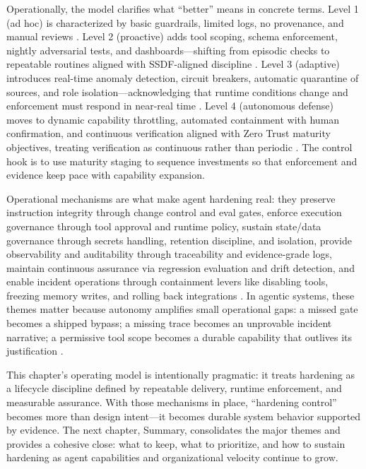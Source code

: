 \begin{TNtwocol}
  Operationally, the model clarifies what “better” means in concrete terms. Level 1 (ad hoc) is characterized by basic guardrails, limited logs, no provenance, and manual reviews \cite{nist-airmf-100-1,owasp-top10-llm-2025}. Level 2 (proactive) adds tool scoping, schema enforcement, nightly adversarial tests, and dashboards—shifting from episodic checks to repeatable routines aligned with SSDF-aligned discipline \cite{owasp-top10-llm-2025,nist-sp800-218}. Level 3 (adaptive) introduces real-time anomaly detection, circuit breakers, automatic quarantine of sources, and role isolation—acknowledging that runtime conditions change and enforcement must respond in near-real time \cite{cisa-ztmm-v2,owasp-top10-llm-2025}. Level 4 (autonomous defense) moves to dynamic capability throttling, automated containment with human confirmation, and continuous verification aligned with Zero Trust maturity objectives, treating verification as continuous rather than periodic \cite{cisa-ztmm-v2,nist-sp800-207}. The control hook is to use maturity staging to sequence investments so that enforcement and evidence keep pace with capability expansion.

  \bigskip

  Operational mechanisms are what make agent hardening real: they preserve instruction integrity through change control and eval gates, enforce execution governance through tool approval and runtime policy, sustain state/data governance through secrets handling, retention discipline, and isolation, provide observability and auditability through traceability and evidence-grade logs, maintain continuous assurance via regression evaluation and drift detection, and enable incident operations through containment levers like disabling tools, freezing memory writes, and rolling back integrations \cite{nist-airmf-100-1,nist-genai-600-1}. In agentic systems, these themes matter because autonomy amplifies small operational gaps: a missed gate becomes a shipped bypass; a missing trace becomes an unprovable incident narrative; a permissive tool scope becomes a durable capability that outlives its justification \cite{nist-sp800-207,cisa-ztmm-v2}.

  \medskip

  This chapter's operating model is intentionally pragmatic: it treats hardening as a lifecycle discipline defined by repeatable delivery, runtime enforcement, and measurable assurance. With those mechanisms in place, “hardening control” becomes more than design intent—it becomes durable system behavior supported by evidence. The next chapter, Summary, consolidates the major themes and provides a cohesive close: what to keep, what to prioritize, and how to sustain hardening as agent capabilities and organizational velocity continue to grow.


\end{TNtwocol}

